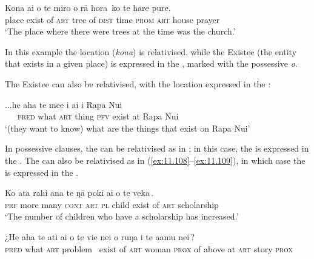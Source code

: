 \ea\label{ex:11.105}
\gll Kona {\ob}ai o te miro o rā hora\,{\cb} ko te hare pure. \\
place {\db}exist of \textsc{art} tree of \textsc{dist} time \textsc{prom} \textsc{art} house prayer \\

\glt
‘The place where there were trees at the time was the church.’ \textstyleExampleref{[R539-1.524]}
\z

In this example the location (\textit{kona}) is relativised, while the Existee (the entity that exists in a given place) is expressed in the , marked with the possessive  \textit{o}. 

The Existee can also be relativised, with the location expressed in the :

\ea\label{ex:11.106}
\gll ...he aha te me{\ꞌ}e {\ob}i ai {\ꞌ}i Rapa Nui\,{\cb} \\
~~~\textsc{pred} what \textsc{art} thing {\db}\textsc{pfv} exist at Rapa Nui \\

\glt
‘(they want to know) what are the things that exist on Rapa Nui’ \textstyleExampleref{[R470.006]} 
\z

In possessive clauses, the  can be relativised as in ; in this case, the  is expressed in the . The  can also be relativised as in (\ref{ex:11.108}–\ref{ex:11.109}), in which case the  is expressed in the .

\ea\label{ex:11.107}
\gll Ko {\ꞌ}ata rahi {\ꞌ}ana te ŋā poki {\ob}ai o te veka\,{\cb}. \\
\textsc{prf} more many \textsc{cont} \textsc{art} \textsc{pl} child {\db}exist of \textsc{art} scholarship \\

\glt 
‘The number of children who have a scholarship has increased.’ \textstyleExampleref{[R648.213]} 
\z

\ea\label{ex:11.108}
\gll ¿He aha te {\ꞌ}ati {\ob}ai o te vi{\ꞌ}e nei o ruŋa i te {\ꞌ}a{\ꞌ}amu nei\,{\cb}?\\
{\db}\textsc{pred} what \textsc{art} problem ~exist of \textsc{art} woman \textsc{prox} of above at \textsc{art} story \textsc{prox}\\

